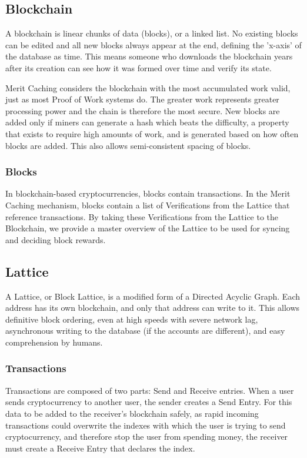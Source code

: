 \documentclass[14pt]{article}
\begin{document}
\label{sec:1.1}
\subsection{Blockchain}
A blockchain is linear chunks of data (blocks), or a linked list. No existing blocks can be edited and all new blocks always appear at the end, defining the 'x-axis' of the database as time. This means someone who downloads the blockchain years after its creation can see how it was formed over time and verify its state. 

Merit Caching considers the blockchain with the most accumulated work valid, just as most Proof of Work systems do. The greater work represents greater processing power and the chain is therefore the most secure. New blocks are added only if miners can generate a hash which beats the difficulty, a property that exists to require high amounts of work, and is generated based on how often blocks are added. This also allows semi-consistent spacing of blocks.

\label{sec:1.1.1}
\subsubsection{Blocks}
In blockchain-based cryptocurrencies, blocks contain transactions. In the Merit Caching mechanism, blocks contain a list of Verifications from the Lattice that reference transactions. By taking these Verifications from the Lattice to the Blockchain, we provide a master overview of the Lattice to be used for syncing and deciding block rewards.

\label{sec:1.2}
\subsection{Lattice}
A Lattice, or Block Lattice, is a modified form of a Directed Acyclic Graph. Each address has its own blockchain, and only that address can write to it. This allows definitive block ordering, even at high speeds with severe network lag, asynchronous writing to the database (if the accounts are different), and easy comprehension by humans.

\label{sec:1.2.1}
\subsubsection{Transactions}
Transactions are composed of two parts: Send and Receive entries. When a user sends cryptocurrency to another user, the sender creates a Send Entry. For this data to be added to the receiver's blockchain safely, as rapid incoming transactions could overwrite the indexes with which the user is trying to send cryptocurrency, and therefore stop the user from spending money, the receiver must create a Receive Entry that declares the index.
\end{document}
